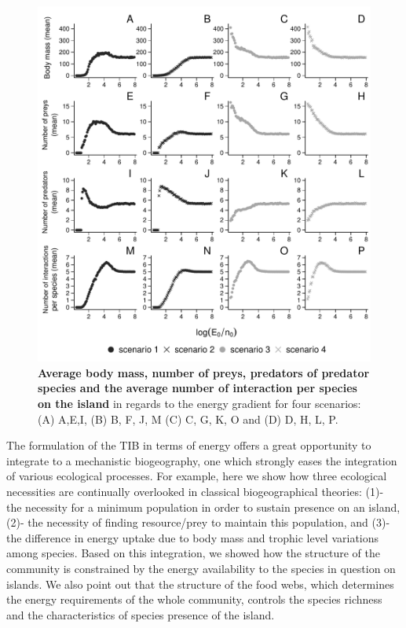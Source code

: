 \begin{figure}[htbp]
\centering
\includegraphics{chapitre4/fig/fig4.pdf}
\caption{\textbf{Average body mass, number of preys, predators of
predator species and the average number of interaction per species on
the island} in regards to the energy gradient for four scenarios: (A)
A,E,I, (B) B, F, J, M (C) C, G, K, O and (D) D, H, L,
P.\label{fig:etib4}}
\end{figure}

The formulation of the TIB in terms of energy offers a great opportunity
to integrate to a mechanistic biogeography, one which strongly eases the
integration of various ecological processes. For example, here we show
how three ecological necessities are continually overlooked in classical
biogeographical theories: (1)- the necessity for a minimum population in
order to sustain presence on an island, (2)- the necessity of finding
resource/prey to maintain this population, and (3)- the difference in
energy uptake due to body mass and trophic level variations among
species. Based on this integration, we showed how the structure of the
community is constrained by the energy availability to the species in
question on islands. We also point out that the structure of the food
webs, which determines the energy requirements of the whole community,
controls the species richness and the characteristics of species
presence of the island.

